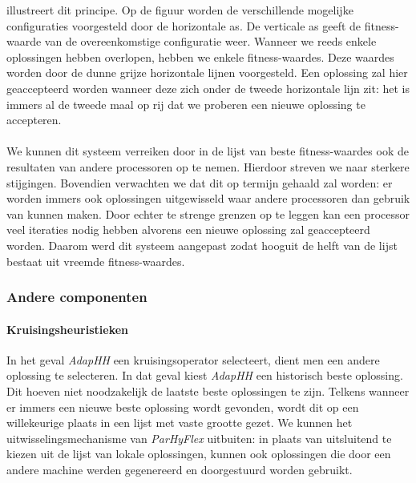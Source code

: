 
 illustreert dit principe. Op de figuur worden de verschillende mogelijke configuraties voorgesteld door de horizontale as. De verticale as geeft de fitness-waarde van de overeenkomstige configuratie weer. Wanneer we reeds enkele oplossingen hebben overlopen, hebben we enkele fitness-waardes. Deze waardes worden door de dunne grijze horizontale lijnen voorgesteld. Een oplossing zal hier geaccepteerd worden wanneer deze zich onder de tweede horizontale lijn zit: het is immers al de tweede maal op rij dat we proberen een nieuwe oplossing te accepteren. %

\paragraph{}
We kunnen dit systeem verreiken door in de lijst van beste fitness-waardes ook de resultaten van andere processoren op te nemen. Hierdoor streven we naar sterkere stijgingen. Bovendien verwachten we dat dit op termijn gehaald zal worden: er worden immers ook oplossingen uitgewisseld waar andere processoren dan gebruik van kunnen maken. Door echter te strenge grenzen op te leggen kan een processor veel iteraties nodig hebben alvorens een nieuwe oplossing zal geaccepteerd worden. Daarom werd dit systeem aangepast zodat hooguit de helft van de lijst bestaat uit vreemde fitness-waardes.

\subsubsection{Andere componenten}

\paragraph{Kruisingsheuristieken}
In het geval \emph{AdapHH} een kruisingsoperator selecteert, dient men een andere oplossing te selecteren. In dat geval kiest \emph{AdapHH} een historisch beste oplossing. Dit hoeven niet noodzakelijk de laatste beste oplossingen te zijn. Telkens wanneer er immers een nieuwe beste oplossing wordt gevonden, wordt dit op een willekeurige plaats in een lijst met vaste grootte gezet. We kunnen het uitwisselingsmechanisme van \emph{ParHyFlex} uitbuiten: in plaats van uitsluitend te kiezen uit de lijst van lokale oplossingen, kunnen ook oplossingen die door een andere machine werden gegenereerd en doorgestuurd worden gebruikt.